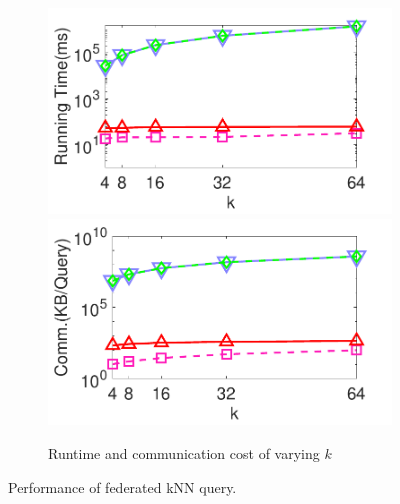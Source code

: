 \begin{figure}[t]
\begin{subfigure}{0.48\textwidth}
        \includegraphics[width=0.48\linewidth]{knn_k_time.pdf}
        \includegraphics[width=0.48\linewidth]{knn_k_cost.pdf}
        \caption{Runtime and communication cost of varying $k$}
        \label{fig:knn-eff-k}
    \end{subfigure}
    \caption{Performance of federated kNN query.}
    \label{fig:knn-eff}
\end{figure}


